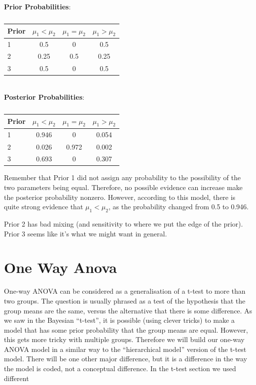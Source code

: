 \begin{table}
\begin{center}
{\bf Prior Probabilities}:\\
\begin{tabular}{|l|c|c|c|}
\hline
Prior	&	$\mu_1 < \mu_2$	& $\mu_1 = \mu_2$	& $\mu_1 > \mu_2$\\
\hline
1 	&	0.5		&	0		&	0.5\\
2 	&	0.25		&	0.5		&	0.25\\
3 	&	0.5		&	0		&	0.5\\
\hline
\end{tabular}\\
{\bf Posterior Probabilities}:\\
\begin{tabular}{|l|c|c|c|}
\hline
Prior	&	$\mu_1 < \mu_2$	& $\mu_1 = \mu_2$	& $\mu_1 > \mu_2$\\
\hline
1 	&	0.946		&	0		&	0.054\\
2 	&	0.026		&	0.972		&	0.002\\
3 	&	0.693		&	0		&	0.307\\
\hline
\end{tabular}

\caption{\label{tab:ttest_results}}
\end{center}
\end{table}

Remember that Prior 1 did not assign any probability to the possibility of the
two parameters being equal. Therefore, no possible evidence can increase
make the posterior probability nonzero. However, according to this model, there
is quite strong evidence that $\mu_1 < \mu_2$, as the probability changed from
0.5 to 0.946.


Prior 2 has bad mixing (and sensitivity to where we put the edge of the prior).
Prior 3 seems like it's what we might want in general.


\section{One Way Anova}
One-way ANOVA can be considered as a generalisation of a t-test to more than
two groups. The question is usually phrased as a test of the hypothesis that
the group means are the same, versus the alternative that there is some difference.
As we saw in the Bayesian ``t-test'', it is possible (using clever tricks) to
make a model that has some prior probability that the group means are equal.
However, this gets more tricky with multiple groups. Therefore we will build our
one-way ANOVA model in a similar way to the ``hierarchical model'' version of the
t-test model. There will be one other major difference, but it is a difference
in the way the model is coded, not a conceptual difference. In the t-test
section we used different 

